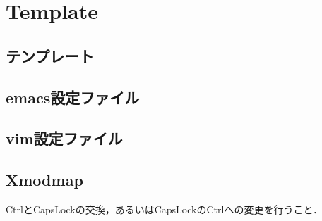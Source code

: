 \section{Template}

\subsection{テンプレート}


\subsection{emacs設定ファイル}


\subsection{vim設定ファイル}


\subsection{Xmodmap}
CtrlとCapsLockの交換，あるいはCapsLockのCtrlへの変更を行うこと．

